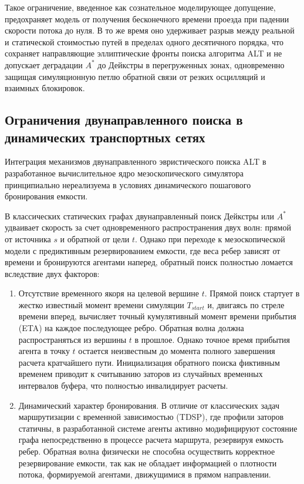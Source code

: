 Такое ограничение, введенное как сознательное моделирующее допущение, предохраняет модель от получения бесконечного времени проезда при падении скорости потока до нуля. В то же время оно удерживает разрыв между реальной и статической стоимостью путей в пределах одного десятичного порядка, что сохраняет направляющие эллиптические фронты поиска алгоритма ALT и не допускает деградации $A^*$ до Дейкстры в перегруженных зонах, одновременно защищая симуляционную петлю обратной связи от резких осцилляций и взаимных блокировок.

\subsection{Ограничения двунаправленного поиска в динамических транспортных сетях}\label{subsec:bidirectional_limitations}
Интеграция механизмов двунаправленного эвристического поиска ALT в разработанное вычислительное ядро мезоскопического симулятора принципиально нереализуема в условиях динамического пошагового бронирования емкости.

В классических статических графах двунаправленный поиск Дейкстры или $A^*$ удваивает скорость за счет одновременного распространения двух волн: прямой от источника $s$ и обратной от цели $t$. Однако при переходе к мезоскопической модели с предиктивным резервированием емкости, где веса ребер зависят от времени и бронируются агентами наперед, обратный поиск полностью ломается вследствие двух факторов:
\begin{enumerate}
    \item Отсутствие временного якоря на целевой вершине $t$. Прямой поиск стартует в жестко известный момент времени симуляции $T_{start}$ и, двигаясь по стреле времени вперед, вычисляет точный кумулятивный момент времени прибытия (ETA) на каждое последующее ребро. Обратная волна должна распространяться из вершины $t$ в прошлое. Однако точное время прибытия агента в точку $t$ остается неизвестным до момента полного завершения расчета кратчайшего пути. Инициализация обратного поиска фиктивным временем приводит к считыванию заторов из случайных временных интервалов буфера, что полностью инвалидирует расчеты.
    \item Динамический характер бронирования. В отличие от классических задач маршрутизации с временной зависимостью (TDSP), где профили заторов статичны, в разработанной системе агенты активно модифицируют состояние графа непосредственно в процессе расчета маршрута, резервируя емкость ребер. Обратная волна физически не способна осуществить корректное резервирование емкости, так как не обладает информацией о плотности потока, формируемой агентами, движущимися в прямом направлении.
\end{enumerate}


